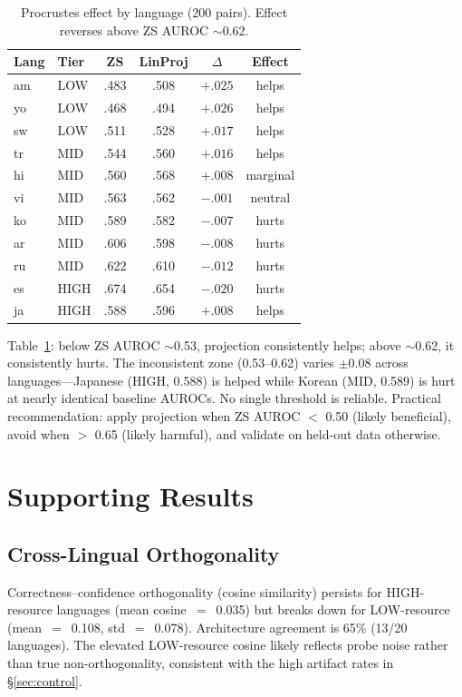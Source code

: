 \documentclass[11pt,a4paper]{article}
\begin{document}
\begin{table}[t]
\centering
\small
\caption{Procrustes effect by language (200 pairs). Effect reverses above ZS AUROC $\sim$0.62.}
\label{tab:reversal}
\begin{tabular}{llcccc}
\toprule
Lang & Tier & ZS & LinProj & $\Delta$ & Effect \\
\midrule
am & LOW & .483 & .508 & $+.025$ & helps \\
yo & LOW & .468 & .494 & $+.026$ & helps \\
sw & LOW & .511 & .528 & $+.017$ & helps \\
tr & MID & .544 & .560 & $+.016$ & helps \\
hi & MID & .560 & .568 & $+.008$ & marginal \\
vi & MID & .563 & .562 & $-.001$ & neutral \\
ko & MID & .589 & .582 & $-.007$ & hurts \\
ar & MID & .606 & .598 & $-.008$ & hurts \\
ru & MID & .622 & .610 & $-.012$ & hurts \\
es & HIGH & .674 & .654 & $-.020$ & hurts \\
ja & HIGH & .588 & .596 & $+.008$ & helps \\
\bottomrule
\end{tabular}
\end{table}

Table~\ref{tab:reversal}: below ZS AUROC $\sim$0.53, projection consistently helps; above $\sim$0.62, it consistently hurts.
The inconsistent zone (0.53--0.62) varies $\pm$0.08 across languages---Japanese (HIGH, 0.588) is helped while Korean (MID, 0.589) is hurt at nearly identical baseline AUROCs.
No single threshold is reliable.
Practical recommendation: apply projection when ZS AUROC $<$ 0.50 (likely beneficial), avoid when $>$ 0.65 (likely harmful), and validate on held-out data otherwise.

\section{Supporting Results}

\subsection{Cross-Lingual Orthogonality}

Correctness--confidence orthogonality (cosine similarity) persists for HIGH-resource languages (mean cosine~$=$~0.035) but breaks down for LOW-resource (mean~$=$~0.108, std~$=$~0.078).
Architecture agreement is 65\% (13/20 languages).
The elevated LOW-resource cosine likely reflects probe noise rather than true non-orthogonality, consistent with the high artifact rates in \S\ref{sec:control}.
\end{document}
